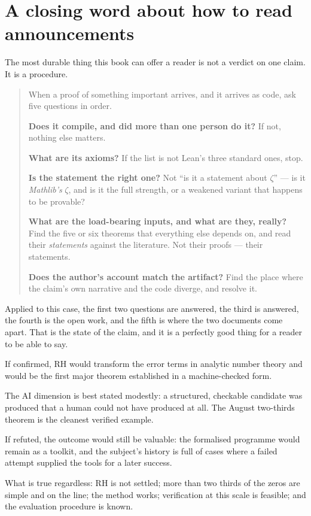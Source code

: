 \section{A closing word about how to read announcements}The most durable thing this book can offer a reader is not a verdict on one
claim. It is a procedure.

\begin{quote}
When a proof of something important arrives, and it arrives as code, ask five
questions in order.

\textbf{Does it compile, and did more than one person do it?} If not, nothing
else matters.

\textbf{What are its axioms?} If the list is not Lean's three standard ones,
stop.

\textbf{Is the statement the right one?} Not ``is it a statement about
$\zeta$'' --- is it \emph{Mathlib's} $\zeta$, and is it the full strength, or
a weakened variant that happens to be provable?

\textbf{What are the load-bearing inputs, and what are they, really?} Find the
five or six theorems that everything else depends on, and read their
\emph{statements} against the literature. Not their proofs --- their
statements.

\textbf{Does the author's account match the artifact?} Find the place where
the claim's own narrative and the code diverge, and resolve it.
\end{quote}

Applied to this case, the first two questions are answered, the third is
answered, the fourth is the open work, and the fifth is where the two
documents come apart. That is the state of the claim, and it is a perfectly
good thing for a reader to be able to say.

\begin{keytakeaways}

\item If confirmed, RH would transform the error terms in analytic number
theory and would be the first major theorem established in a machine-checked
form.
\item The AI dimension is best stated modestly: a structured, checkable
candidate was produced that a human could not have produced at all. The
August two-thirds theorem is the cleanest verified example.
\item If refuted, the outcome would still be valuable: the formalised
programme would remain as a toolkit, and the subject's history is full of
cases where a failed attempt supplied the tools for a later success.
\item What is true regardless: RH is not settled; more than two thirds of the
zeros are simple and on the line; the method works; verification at this
scale is feasible; and the evaluation procedure is known.
\end{keytakeaways}

